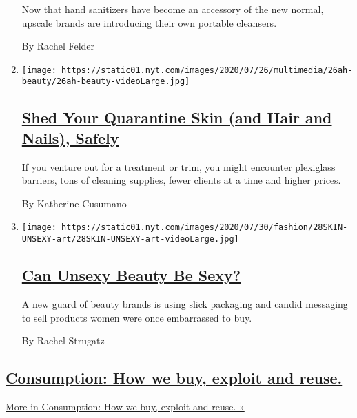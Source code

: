 \begin{enumerate}
  Now that hand sanitizers have become an accessory of the new normal,
  upscale brands are introducing their own portable cleansers.

  By Rachel Felder
\item
  \texttt{[image: https://static01.nyt.com/images/2020/07/26/multimedia/26ah-beauty/26ah-beauty-videoLarge.jpg]}

  \hypertarget{shed-your-quarantine-skin-and-hair-and-nails-safely}{%
  \subsection{\texorpdfstring{\href{/2020/07/25/at-home/coronavirus-salons.html}{Shed
  Your Quarantine Skin (and Hair and Nails),
  Safely}}{Shed Your Quarantine Skin (and Hair and Nails), Safely}}\label{shed-your-quarantine-skin-and-hair-and-nails-safely}}

  If you venture out for a treatment or trim, you might encounter
  plexiglass barriers, tons of cleaning supplies, fewer clients at a
  time and higher prices.

  By Katherine Cusumano
\item
  \texttt{[image: https://static01.nyt.com/images/2020/07/30/fashion/28SKIN-UNSEXY-art/28SKIN-UNSEXY-art-videoLarge.jpg]}

  \hypertarget{can-unsexy-beauty-be-sexy}{%
  \subsection{\texorpdfstring{\href{/2020/07/28/style/can-unsexy-beauty-be-sexy.html}{Can
  Unsexy Beauty Be
  Sexy?}}{Can Unsexy Beauty Be Sexy?}}\label{can-unsexy-beauty-be-sexy}}

  A new guard of beauty brands is using slick packaging and candid
  messaging to sell products women were once embarrassed to buy.

  By Rachel Strugatz
\end{enumerate}

\hypertarget{consumption-how-we-buy-exploit-and-reuse}{%
\subsection{\texorpdfstring{\href{/issue/fashion/2019/12/16/consumption}{Consumption:
How we buy, exploit and
reuse.}}{Consumption: How we buy, exploit and reuse.}}\label{consumption-how-we-buy-exploit-and-reuse}}

\href{/issue/fashion/2019/12/16/consumption}{More in Consumption: How we
buy, exploit and reuse. »}

